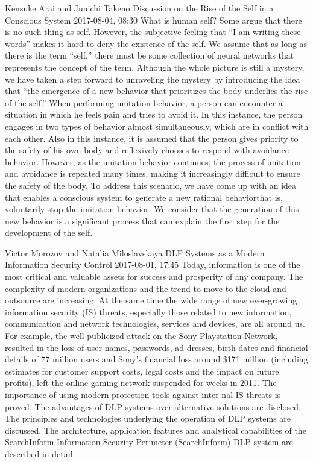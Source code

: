 \documentclass[10pt,fleqn,openany]{book} %
\begin{document}
\begin{enumerate}
		
		\paperabstract
		{Kensuke Arai and Junichi Takeno}
		{Discussion on the Rise of the Self in a Conscious System}
		{2017-08-04, 08:30}
		{What is human self? Some argue that there is no such thing as self. However, the subjective feeling that ``I am writing these words'' makes it hard to deny the existence of the self. We assume that as long as there is the term ``self,'' there must be some collection of neural networks that represents the concept of the term. Although the whole picture is still a mystery, we have taken a step forward to unraveling the mystery by introducing the idea that ``the emergence of a new behavior that prioritizes the body underlies the rise of the self.'' When performing imitation behavior, a person can encounter a situation in which he feels pain and tries to avoid it. In this instance, the person engages in two types of behavior almost simultaneously, which are in conflict with each other. Also in this instance, it is assumed that the person gives priority to the safety of his own body and reflexively chooses to respond with avoidance behavior. However, as the imitation behavior continues, the process of imitation and avoidance is repeated many times, making it increasingly difficult to ensure the safety of the body. To address this scenario, we have come up with an idea that enables a conscious system to generate a new rational behaviorthat is, voluntarily stop the imitation behavior. We consider that the generation of this new behavior is a significant process that can explain the first step for the development of the self.}
		
		
		\paperabstract
		{Victor Morozov and Natalia Miloslavskaya}
		{DLP Systems as a Modern Information Security Control}
		{2017-08-01, 17:45}
		{Today, information is one of the most critical and valuable assets for success and prosperity of any company. The complexity of modern organizations and the trend to move to the cloud and outsource are increasing. At the same time the wide range of new ever-growing information security (IS) threats, especially those related to new information, communication and network technologies, services and devices, are all around us. For example, the well-publicized attack on the Sony Playstation Network, resulted in the loss of user names, passwords, ad-dresses, birth dates and financial details of 77 million users and Sony's financial loss around \$171 million (including estimates for customer support costs, legal costs and the impact on future profits), left the online gaming network suspended for weeks in 2011. The importance of using modern protection tools against inter-nal IS threats is proved. The advantages of DLP systems over alternative solutions are disclosed. The principles and technologies underlying the operation of DLP systems are discussed. The architecture, application features and analytical capabilities of the SearchInform Information Security Perimeter (SearchInform) DLP system are described in detail.}
		

\end{enumerate}
\end{document}
